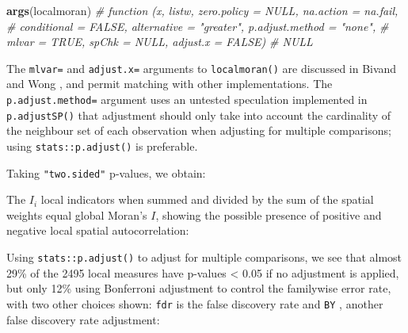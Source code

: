 \documentclass[]{book}
\newenvironment{Shaded}{\begin{snugshade}}{\end{snugshade}}
\newcommand{\CommentTok}[1]{\textcolor[rgb]{0.56,0.35,0.01}{\textit{#1}}}
\newcommand{\DataTypeTok}[1]{\textcolor[rgb]{0.13,0.29,0.53}{#1}}
\newcommand{\DecValTok}[1]{\textcolor[rgb]{0.00,0.00,0.81}{#1}}
\newcommand{\KeywordTok}[1]{\textcolor[rgb]{0.13,0.29,0.53}{\textbf{#1}}}
\newcommand{\NormalTok}[1]{#1}
\newcommand{\OperatorTok}[1]{\textcolor[rgb]{0.81,0.36,0.00}{\textbf{#1}}}
\newcommand{\StringTok}[1]{\textcolor[rgb]{0.31,0.60,0.02}{#1}}
\begin{document}
\begin{Shaded}
\begin{Highlighting}[]
\KeywordTok{args}\NormalTok{(localmoran)}
\CommentTok{# function (x, listw, zero.policy = NULL, na.action = na.fail, }
\CommentTok{#     conditional = FALSE, alternative = "greater", p.adjust.method = "none", }
\CommentTok{#     mlvar = TRUE, spChk = NULL, adjust.x = FALSE) }
\CommentTok{# NULL}
\end{Highlighting}
\end{Shaded}

The \texttt{mlvar=} and \texttt{adjust.x=} arguments to \texttt{localmoran()} are discussed in Bivand and Wong \citeyearpar{Bivand2018}, and permit matching with other implementations. The \texttt{p.adjust.method=} argument uses an untested speculation implemented in \texttt{p.adjustSP()} that adjustment should only take into account the cardinality of the neighbour set of each observation when adjusting for multiple comparisons; using \texttt{stats::p.adjust()} is preferable.

Taking \texttt{"two.sided"} p-values, we obtain:

\begin{Shaded}
\end{Shaded}

The \(I_i\) local indicators when summed and divided by the sum of the spatial weights equal global Moran's \(I\), showing the possible presence of positive and negative local spatial autocorrelation:

\begin{Shaded}
\end{Shaded}

Using \texttt{stats::p.adjust()} to adjust for multiple comparisons, we see that almost 29\% of the 2495 local measures have p-values \textless{} 0.05 if no adjustment is applied, but only 12\% using Bonferroni adjustment to control the familywise error rate, with two other choices shown: \texttt{fdr} is the \citet{fdr-BH} false discovery rate and \texttt{BY} \citep{10.1214/aos/1013699998}, another false discovery rate adjustment:
\end{document}
